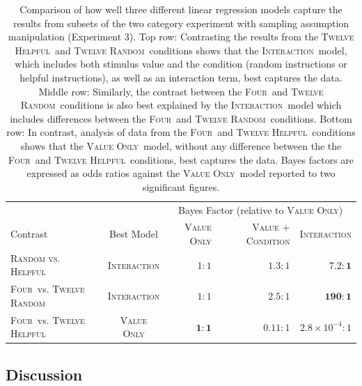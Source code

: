 \documentclass[doc,apacite]{apa6}
\newcommand{\four}{\textsc{Four}}
\newcommand{\random}{\textsc{Twelve Random}}
\newcommand{\helpful}{\textsc{Twelve Helpful}}
\newcommand{\bothtwelve}{\textsc{Random vs. Helpful}}
\newcommand{\neutral}{\textsc{Four}}
\newcommand{\valueonly}{\textsc{Value Only}}
\newcommand{\interaction}{\textsc{Interaction}}
\begin{document}
\begin{table}[tbp]
\hspace{-5mm}
\small 
\begin{tabular}{lcrrr}
\toprule 
 & & \multicolumn{3}{c}{Bayes Factor (relative to \valueonly)} \\
\cmidrule{3-5}
Contrast & Best Model & \valueonly & \textsc{Value + Condition} & \interaction \\
\midrule 
\bothtwelve\ & \interaction & $1 : 1$ & $1.3 : 1$ & $\mathbf{7.2 : 1}$\\
\neutral\ vs. \random\ & \interaction & $1 : 1$ & $2.5 : 1$ & $\mathbf{190 : 1}$ \\
\neutral\ vs. \helpful\ & \valueonly & $\mathbf{1 : 1}$ & $0.11 : 1$ & $2.8 \times 10^{-4} :1$\\
\bottomrule 
\end{tabular}
\caption{%
Comparison of how well three different linear regression models capture the results from subsets of the two category experiment with sampling assumption manipulation (Experiment 3). 
%
Top row: Contrasting the results from the \helpful\ and \random\ conditions shows that the \interaction\ model, which includes both
stimulus value and the condition (random instructions or helpful instructions), as well as an interaction term, best captures the data. 
%
Middle row: Similarly, the contrast between the \neutral\ and 
\random\ conditions is also best explained by the \interaction\ model which includes differences between the \four\ and \random\ conditions.
%
Bottom row: In contrast, analysis of data from the \neutral\ and 
\helpful\ conditions shows that the \valueonly\ model, without any difference between the the \four\ and \helpful\ conditions, best captures the data.
%
Bayes factors are expressed as odds ratios against the \valueonly\ model reported to two significant figures.
}
\label{tbl:exp3:bf1}
\end{table}





\subsection{Discussion}
\end{document}
